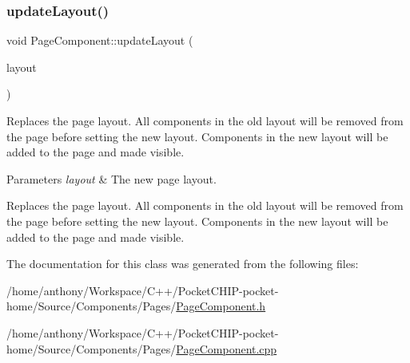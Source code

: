 \subsubsection{\texorpdfstring{update\+Layout()}{updateLayout()}}
{\footnotesize\ttfamily void Page\+Component\+::update\+Layout (\begin{DoxyParamCaption}\item[{\mbox{\hyperlink{classRelativeLayoutManager_a3dcd4cd0bc41754f3b4a64bc29b5eca5}{Relative\+Layout\+Manager\+::\+Layout}}}]{layout }\end{DoxyParamCaption})\hspace{0.3cm}{\ttfamily [protected]}}

Replaces the page layout. All components in the old layout will be removed from the page before setting the new layout. Components in the new layout will be added to the page and made visible.


\begin{DoxyParams}{Parameters}
{\em layout} & The new page layout.\\
\hline
\end{DoxyParams}
Replaces the page layout. All components in the old layout will be removed from the page before setting the new layout. Components in the new layout will be added to the page and made visible. 

The documentation for this class was generated from the following files\+:\begin{DoxyCompactItemize}
\item 
/home/anthony/\+Workspace/\+C++/\+Pocket\+C\+H\+I\+P-\/pocket-\/home/\+Source/\+Components/\+Pages/\mbox{\hyperlink{PageComponent_8h}{Page\+Component.\+h}}\item 
/home/anthony/\+Workspace/\+C++/\+Pocket\+C\+H\+I\+P-\/pocket-\/home/\+Source/\+Components/\+Pages/\mbox{\hyperlink{PageComponent_8cpp}{Page\+Component.\+cpp}}\end{DoxyCompactItemize}
